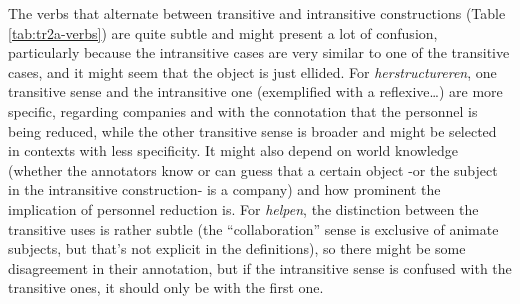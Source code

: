 \documentclass[
]{book}
\begin{document}
The verbs that alternate between transitive and intransitive constructions (Table \ref{tab:tr2a-verbs}) are quite subtle and might present a lot of confusion, particularly because the intransitive cases are very similar to one of the transitive cases, and it might seem that the object is just ellided. For \emph{herstructureren}, one transitive sense and the intransitive one (exemplified with a reflexive\ldots) are more specific, regarding companies and with the connotation that the personnel is being reduced, while the other transitive sense is broader and might be selected in contexts with less specificity. It might also depend on world knowledge (whether the annotators know or can guess that a certain object -or the subject in the intransitive construction- is a company) and how prominent the implication of personnel reduction is. For \emph{helpen}, the distinction between the transitive uses is rather subtle (the ``collaboration'' sense is exclusive of animate subjects, but that's not explicit in the definitions), so there might be some disagreement in their annotation, but if the intransitive sense is confused with the transitive ones, it should only be with the first one.

\providecommand{\docline}[3]{\noalign{\global\setlength{\arrayrulewidth}{#1}}\arrayrulecolor[HTML]{#2}\cline{#3}}

\setlength{\tabcolsep}{2pt}

\renewcommand*{\arraystretch}{1.5}
\end{document}
